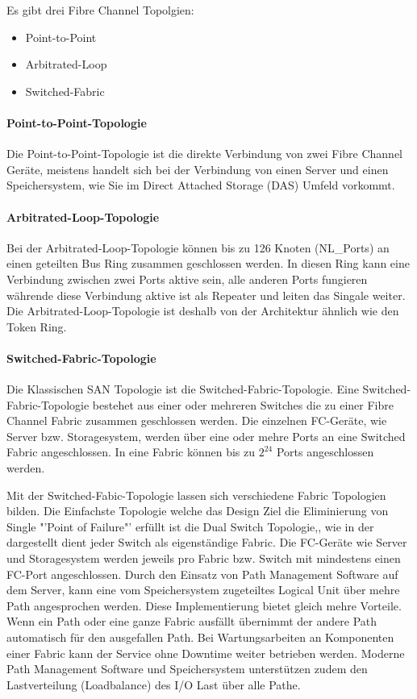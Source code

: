 Es gibt drei Fibre Channel Topolgien:
\begin{itemize}
\item Point-to-Point
\item Arbitrated-Loop
\item Switched-Fabric
\end{itemize}

\paragraph*{Point-to-Point-Topologie}
Die Point-to-Point-Topologie ist die direkte Verbindung von zwei Fibre Channel Geräte, meistens handelt sich bei der Verbindung von einen Server und einen Speichersystem, wie Sie im Direct Attached Storage (DAS) Umfeld vorkommt. \cite{Christopher2009}

\paragraph*{Arbitrated-Loop-Topologie}
Bei der Arbitrated-Loop-Topologie können bis zu  126 Knoten (NL\_Ports) an einen geteilten Bus Ring zusammen geschlossen werden. In diesen Ring kann eine Verbindung zwischen zwei Ports aktive sein, alle anderen Ports fungieren währende diese Verbindung aktive ist als Repeater und leiten das Singale weiter. Die Arbitrated-Loop-Topologie ist deshalb von der Architektur ähnlich wie den Token Ring. \cite{Gupta2002}\cite{Christopher2009}

\paragraph*{Switched-Fabric-Topologie}
Die Klassischen SAN Topologie ist die Switched-Fabric-Topologie. Eine Switched-Fabric-Topologie bestehet aus einer oder mehreren Switches die zu einer Fibre Channel Fabric zusammen geschlossen werden. Die einzelnen FC-Geräte, wie Server bzw. Storagesystem, werden über eine oder mehre Ports an eine Switched Fabric angeschlossen. In eine Fabric können bis zu $2^{24}$ Ports angeschlossen werden. \cite{Gupta2002}\cite{Christopher2009}

Mit der Switched-Fabic-Topologie lassen sich verschiedene Fabric Topologien bilden.
Die Einfachste Topologie welche das Design Ziel die Eliminierung von Single "'Point of Failure"' erfüllt ist die Dual Switch Topologie,, wie in der  dargestellt dient jeder Switch als eigenständige Fabric. Die FC-Geräte wie Server und Storagesystem werden jeweils pro Fabric bzw. Switch mit mindestens einen FC-Port angeschlossen. Durch den Einsatz von Path Management Software auf dem Server, kann eine vom Speichersystem zugeteiltes Logical Unit über mehre Path angesprochen werden. Diese Implementierung bietet gleich mehre Vorteile. Wenn ein Path oder eine ganze Fabric ausfällt übernimmt der andere Path automatisch für den ausgefallen Path. Bei Wartungsarbeiten an Komponenten einer Fabric kann der Service ohne Downtime weiter betrieben werden. Moderne Path Management Software und Speichersystem unterstützen zudem den Lastverteilung (Loadbalance) des I/O Last über alle Pathe.\cite{Christopher2009}

